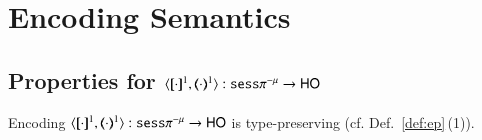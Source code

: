 \section{Encoding Semantics}



\subsection{Properties for $\encod{\cdot}{\cdot}{1}: \sespnr \to \HO$}
\label{app:enc_sesspnr_to_ho}

\begin{proposition}\rm
	\label{app:enc_sesspnr_to_ho_typing}
	Encoding $\encod{\cdot}{\cdot}{1}: \sespnr \to \HO$  is type-preserving (cf. Def.~\ref{def:ep}\,(1)).\rm
\end{proposition}

